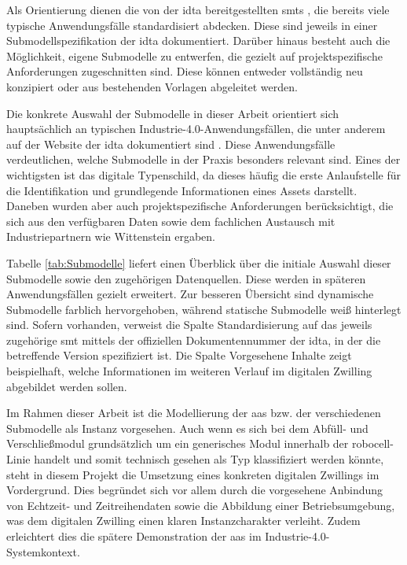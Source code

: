 Als Orientierung dienen die von der \acs{idta} bereitgestellten \acsp{smt} \cite{idtaTemplates}, die bereits viele typische Anwendungsfälle standardisiert abdecken.
Diese sind jeweils in einer Submodellspezifikation der \acs{idta} dokumentiert.
Darüber hinaus besteht auch die Möglichkeit, eigene Submodelle zu entwerfen, die gezielt auf projektspezifische Anforderungen zugeschnitten sind.
Diese können entweder vollständig neu konzipiert oder aus bestehenden Vorlagen abgeleitet werden.

Die konkrete Auswahl der Submodelle in dieser Arbeit orientiert sich hauptsächlich an typischen Industrie-4.0-Anwendungsfällen, die unter anderem auf der Website der \acs{idta} dokumentiert sind \cite{idtaUseCases}.
Diese Anwendungsfälle verdeutlichen, welche Submodelle in der Praxis besonders relevant sind.
Eines der wichtigsten ist das digitale Typenschild, da dieses häufig die erste Anlaufstelle für die Identifikation und grundlegende Informationen eines Assets darstellt.
Daneben wurden aber auch projektspezifische Anforderungen berücksichtigt, die sich aus den verfügbaren Daten sowie dem fachlichen Austausch mit Industriepartnern wie Wittenstein ergaben.

Tabelle \ref{tab:Submodelle} liefert einen Überblick über die initiale Auswahl dieser Submodelle sowie den zugehörigen Datenquellen.
Diese werden in späteren Anwendungsfällen gezielt erweitert.
Zur besseren Übersicht sind dynamische Submodelle farblich hervorgehoben, während statische Submodelle weiß hinterlegt sind.
Sofern vorhanden, verweist die Spalte \mbox{Standardisierung} auf das jeweils zugehörige \acs{smt} mittels der offiziellen Dokumentennummer der \acs{idta}, in der die betreffende Version spezifiziert ist.
Die Spalte Vorgesehene Inhalte zeigt beispielhaft, welche Informationen im weiteren Verlauf im digitalen Zwilling abgebildet werden sollen.

\vspace{-0.1em}


\newpage
Im Rahmen dieser Arbeit ist die Modellierung der \acs{aas} bzw. der verschiedenen Submodelle als Instanz vorgesehen.
Auch wenn es sich bei dem Abfüll- und Verschließmodul grundsätzlich um ein generisches Modul innerhalb der robocell-Linie handelt und somit technisch gesehen als Typ klassifiziert werden könnte, steht in diesem Projekt die Umsetzung eines konkreten digitalen Zwillings im Vordergrund.
Dies begründet sich vor allem durch die vorgesehene Anbindung von Echtzeit- und Zeitreihendaten sowie die Abbildung einer Betriebsumgebung, was dem digitalen Zwilling einen klaren Instanzcharakter verleiht.
Zudem erleichtert dies die spätere Demonstration der \acs{aas} im Industrie-4.0-Systemkontext.


